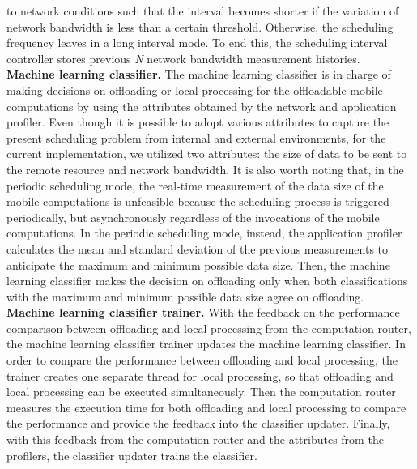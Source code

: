 \documentclass[10pt, conference, compsocconf]{IEEEtran}
\begin{document}
to network conditions such that the interval becomes shorter if the
variation of network bandwidth is less than a certain threshold.
%
Otherwise, the scheduling frequency leaves in a long interval mode.
%
To end this, the scheduling interval controller stores previous
\textit{N} network bandwidth measurement histories.\\
%
\textbf{Machine learning classifier.} The machine learning classifier is
in charge of making decisions on offloading or local processing for the
offloadable mobile computations by using the attributes obtained by
the network and application profiler.
%
Even though it is possible to adopt various attributes to capture the
present scheduling problem from internal and external environments, for
the current implementation, we utilized two attributes: the size of data
to be sent to the remote resource and network bandwidth.
%
It is also worth noting that, in the periodic scheduling mode, the
real-time measurement of the data size of the mobile computations is
unfeasible because the scheduling process is triggered periodically, but
asynchronously regardless of the invocations of the mobile computations.
%
In the periodic scheduling mode, instead, the application profiler
calculates the mean and standard deviation of the previous measurements
to anticipate the maximum and minimum possible data size.
%
Then, the machine learning classifier makes the decision on offloading
only when both classifications with the maximum and minimum possible
data size agree on offloading.\\
%
\textbf{Machine learning classifier trainer.} With the feedback on the
performance comparison between offloading and local processing from the
computation router, the machine learning classifier trainer updates
the machine learning classifier.
%
In order to compare the performance between offloading and local
processing, the trainer creates one separate thread for local
processing, so that offloading and local processing can be executed
simultaneously.
%
Then the computation router measures the execution time for both
offloading and local processing to compare the performance and provide
the feedback into the classifier updater.
%
Finally, with this feedback from the computation router and the
attributes from the profilers, the classifier updater trains the
classifier.
%
\end{document}
